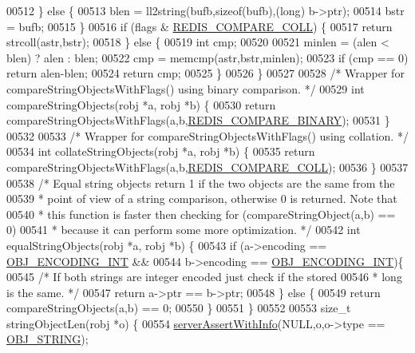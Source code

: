 \begin{DoxyCode}
{00512     \} \textcolor{keywordflow}{else} \{
00513         blen = ll2string(bufb,\textcolor{keyword}{sizeof}(bufb),(\textcolor{keywordtype}{long}) b->ptr);
00514         bstr = bufb;
00515     \}
00516     \textcolor{keywordflow}{if} (flags & \hyperlink{object_8c_aa471c38fc2e9e96a23693e7ff5e73209}{REDIS\_COMPARE\_COLL}) \{
00517         \textcolor{keywordflow}{return} strcoll(astr,bstr);
00518     \} \textcolor{keywordflow}{else} \{
00519         \textcolor{keywordtype}{int} cmp;
00520 
00521         minlen = (alen < blen) ? alen : blen;
00522         cmp = memcmp(astr,bstr,minlen);
00523         \textcolor{keywordflow}{if} (cmp == 0) \textcolor{keywordflow}{return} alen-blen;
00524         \textcolor{keywordflow}{return} cmp;
00525     \}
00526 \}
00527 
00528 \textcolor{comment}{/* Wrapper for compareStringObjectsWithFlags() using binary comparison. */}
00529 \textcolor{keywordtype}{int} compareStringObjects(robj *a, robj *b) \{
00530     \textcolor{keywordflow}{return} compareStringObjectsWithFlags(a,b,\hyperlink{object_8c_ac672f1c478e4a045035444729510d946}{REDIS\_COMPARE\_BINARY});
00531 \}
00532 
00533 \textcolor{comment}{/* Wrapper for compareStringObjectsWithFlags() using collation. */}
00534 \textcolor{keywordtype}{int} collateStringObjects(robj *a, robj *b) \{
00535     \textcolor{keywordflow}{return} compareStringObjectsWithFlags(a,b,\hyperlink{object_8c_aa471c38fc2e9e96a23693e7ff5e73209}{REDIS\_COMPARE\_COLL});
00536 \}
00537 
00538 \textcolor{comment}{/* Equal string objects return 1 if the two objects are the same from the}
00539 \textcolor{comment}{ * point of view of a string comparison, otherwise 0 is returned. Note that}
00540 \textcolor{comment}{ * this function is faster then checking for (compareStringObject(a,b) == 0)}
00541 \textcolor{comment}{ * because it can perform some more optimization. */}
00542 \textcolor{keywordtype}{int} equalStringObjects(robj *a, robj *b) \{
00543     \textcolor{keywordflow}{if} (a->encoding == \hyperlink{server_8h_ae934cf008a0be0ef009c92c2d006a816}{OBJ\_ENCODING\_INT} &&
00544         b->encoding == \hyperlink{server_8h_ae934cf008a0be0ef009c92c2d006a816}{OBJ\_ENCODING\_INT})\{
00545         \textcolor{comment}{/* If both strings are integer encoded just check if the stored}
00546 \textcolor{comment}{         * long is the same. */}
00547         \textcolor{keywordflow}{return} a->ptr == b->ptr;
00548     \} \textcolor{keywordflow}{else} \{
00549         \textcolor{keywordflow}{return} compareStringObjects(a,b) == 0;
00550     \}
00551 \}
00552 
00553 size\_t stringObjectLen(robj *o) \{
00554     \hyperlink{server_8h_a7308f76cbff9a8d3797fe78190b91282}{serverAssertWithInfo}(NULL,o,o->type == \hyperlink{server_8h_a65236ea160f69cdef33ec942092af88f}{OBJ\_STRING});
}
\end{DoxyCode}
